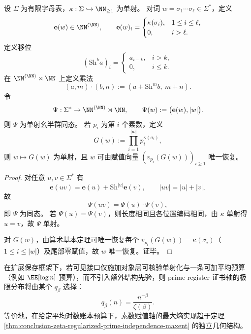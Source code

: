 \begin{proposition}[投影词的哥德尔半直积表示]\label{prop:conclusion-projection-word-godel-semidirect}
设 \(\Sigma\) 为有限字母表，\(\kappa:\Sigma\hookrightarrow\NN_{\ge 1}\) 为单射。
对词 \(w=\sigma_1\cdots\sigma_\ell\in\Sigma^\ast\)，定义
\[
\mathbf e(w)\in \NN^{(\NN)},\qquad
\mathbf e(w)_i=
\begin{cases}
\kappa(\sigma_i),&1\le i\le \ell,\\
0,&i>\ell.
\end{cases}
\]
定义移位
\[
(\mathrm{Sh}^k a)_i=
\begin{cases}
a_{i-k},&i>k,\\
0,&i\le k.
\end{cases}
\]
在 \(\NN^{(\NN)}\rtimes\NN\) 上定义乘法
\[
(a,m)\cdot(b,n):=(a+\mathrm{Sh}^m b,\ m+n).
\]
令
\[
\Psi:\Sigma^\ast\to\NN^{(\NN)}\rtimes\NN,\qquad
\Psi(w):=\bigl(\mathbf e(w),|w|\bigr).
\]
则 \(\Psi\) 为单射幺半群同态。
若 \(p_i\) 为第 \(i\) 个素数，定义
\[
G(w):=\prod_{i=1}^{|w|}p_i^{\kappa(\sigma_i)},
\]
则 \(w\mapsto G(w)\) 为单射，且 \(w\) 可由赋值向量 \((v_{p_i}(G(w)))_{i\ge 1}\) 唯一恢复。
\end{proposition}
\begin{proof}
对任意 \(u,v\in\Sigma^\ast\) 有
\[
\mathbf e(uv)=\mathbf e(u)+\mathrm{Sh}^{|u|}\mathbf e(v),\qquad |uv|=|u|+|v|,
\]
故
\[
\Psi(uv)=\Psi(u)\cdot\Psi(v),
\]
即 \(\Psi\) 为同态。
若 \(\Psi(u)=\Psi(v)\)，则长度相同且各位置编码相同，由 \(\kappa\) 单射得 \(u=v\)，故 \(\Psi\) 单射。

对 \(G(w)\)，由算术基本定理可唯一恢复每个 \(v_{p_i}(G(w))=\kappa(\sigma_i)\)（\(1\le i\le |w|\)）及尾部零赋值，故 \(w\) 唯一恢复。证毕。
\end{proof}







\begin{conjecture}[扩展保存下的最大熵证书选择律]\label{conj:conclusion-extension-preserving-maxent-zeta-selection}
在扩展保存框架下，若可见接口仅施加对象层可核验单射化与一条可加平均预算（例如 \(\EE[\log n]\) 预算），而不引入额外结构先验，则 prime-register 证书轴的极限分布将由某个 \(q_\beta\) 选择：
\[
q_\beta(n)=\frac{n^{-\beta}}{\zeta(\beta)}.
\]
等价地，在给定平均对数账本预算下，素数赋值轴的最大熵实现趋于定理 \ref{thm:conclusion-zeta-regularized-prime-independence-maxent} 的独立几何结构。
\end{conjecture}

